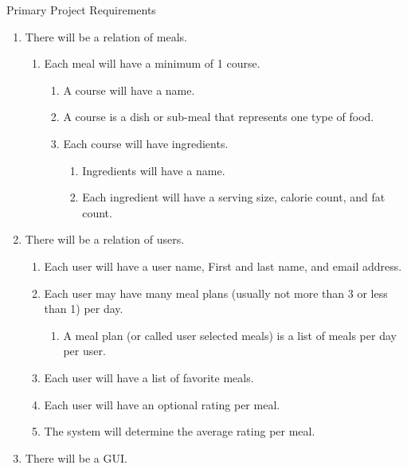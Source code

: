 \documentclass[a4paper,10pt,toc=graduated]{article}
\begin{document}
\begin{mySubsection}{Primary Project Requirements}
\renewcommand{\labelenumi}{\arabic{enumi}. }
\renewcommand{\labelenumii}{\arabic{enumi}.\arabic{enumii}. }
\renewcommand{\labelenumiii}{\arabic{enumi}.\arabic{enumii}.\arabic{enumiii}. }
\renewcommand{\labelenumiv}{\arabic{enumi}.\arabic{enumii}.\arabic{enumiii}. }
\renewcommand{\labelenumiv}{\arabic{enumi}.\arabic{enumii}.\arabic{enumiii}.\arabic{enumiv}. }

\begin{enumerate}
\item
There will be a relation of meals.
\begin{enumerate}
\item
Each meal will have a minimum of 1 course.
\begin{enumerate}
\item
A course will have a name.
\item
A course is a dish or sub-meal that represents one type of food.
\item
Each course will have ingredients.
\begin{enumerate}
\item
Ingredients will have a name.
\item
Each ingredient will have a serving size, calorie count, and fat count.
\end{enumerate}
\end{enumerate}
\end{enumerate}
\item
There will be a relation of users.
\begin{enumerate}
\item
Each user will have a user name, First and last name, and email address.
\item
Each user may have many meal plans (usually not more than 3 or less than 1) per day.
\begin{enumerate}
\item
A meal plan (or called user selected meals) is a list of meals per day per user.
\end{enumerate}
\item
Each user will have a list of favorite meals.
\item
Each user will have an optional rating per meal.
\item
The system will determine the average rating per meal.
\end{enumerate}
\item
There will be a GUI.
\begin{enumerate}

\end{enumerate}
\end{enumerate}
\end{mySubsection}
\end{document}
